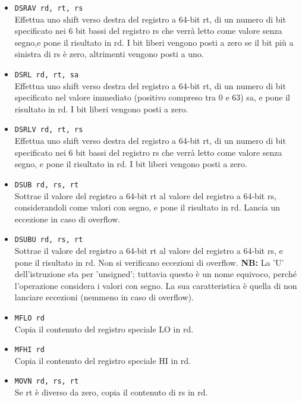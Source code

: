 \documentclass[12pt]{report}
\newcommand{\MISN}{\textbf{NB:} La 'U' dell'istruzione sta per 'unsigned'; tuttavia questo \`{e} 
un nome equivoco, perch\'{e} l'operazione considera i valori con segno. La sua caratteristica \`{e} 
quella di non lanciare eccezioni (nemmeno in caso di overflow).}
\begin{document}
\begin{itemize}
	\item \texttt{DSRAV rd, rt, rs}\\
	Effettua uno shift verso destra del registro a 64-bit rt, di un numero di bit specificato nei 6 bit bassi del registro rs 
	 che verr\`{a} letto come valore senza segno,e pone il risultato in rd. 
	I bit liberi vengono posti a zero se il bit pi\`{u} a sinistra di rs \`{e} zero, altrimenti vengono posti a uno.

	\item \texttt{DSRL rd, rt, sa}\\
	Effettua uno shift verso destra del registro a 64-bit rt, di un numero di bit specificato nel valore immediato (positivo compreso tra 0 e 63) sa, 
	e pone il risultato in rd. I bit liberi vengono posti a zero.
	
	\item \texttt{DSRLV rd, rt, rs}\\
	Effettua uno shift verso destra del registro a 64-bit rt, di un numero di bit specificato nei 6 bit bassi del registro rs che verr\`{a} letto come valore senza segno, 
	e pone il risultato in rd. I bit liberi vengono posti a zero.

	\item \texttt{DSUB rd, rs, rt}\\
	Sottrae il valore del registro a 64-bit rt al valore del registro a 64-bit rs, considerandoli come valori con segno,
	e pone il risultato in rd. Lancia un eccezione in caso di overflow.

	\item \texttt{DSUBU rd, rs, rt}\\
	Sottrae il valore del registro a 64-bit rt al valore del registro a 64-bit rs, e pone il risultato in rd.
	Non si verificano eccezioni di overflow.
	\MISN{}

	\item \texttt{MFLO rd}\\
	Copia il contenuto del registro speciale LO in rd.

	\item \texttt{MFHI rd}\\
	Copia il contenuto del registro speciale HI in rd.

	\item \texttt{MOVN rd, rs, rt}\\
	Se rt \`{e} diverso da zero, copia il contenuto di rs in rd.
	

\end{itemize}
\end{document}

